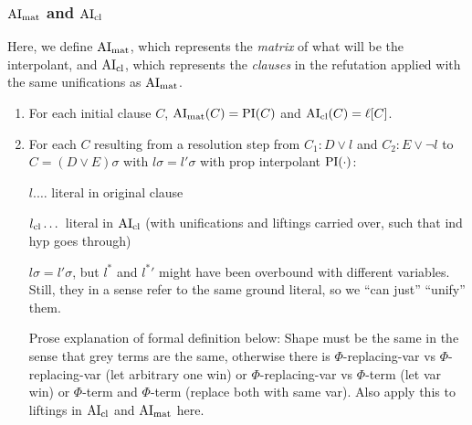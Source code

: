 \documentclass[,%
	paper=a4,%
	DIV15, 
	liststotoc,
	bibtotoc,
	draft=false,%
	numbers=noendperiod
]{scrartcl}
\begin{document}
\subsubsection{$\operatorname{AI}_\mathrm{mat}$ and $\operatorname{AI}_\mathrm{cl}$}

Here, we define $\operatorname{AI}_\mathrm{mat}$, which represents the \emph{matrix} of what will be the interpolant, and $\operatorname{AI}_\mathrm{cl}$, which represents the \emph{clauses} in the refutation applied with the same unifications as $\operatorname{AI}_\mathrm{mat}$.

\begin{enumerate}
	\item 
		For each initial clause $C$, $\operatorname{AI}_\mathrm{mat}(C) = \operatorname{PI}(C)$ and $\operatorname{AI}_\mathrm{cl}(C) = \ell[C]$.

	\item
		For each $C$ resulting from a resolution step from $C_1: D\lor l$ and $C_2: E\lor \lnot l$ to $C = (D \lor E)\sigma$ with $l\sigma = l'\sigma$ with prop interpolant $\operatorname{PI}(\cdot)$:

		$l.\dotsc$ literal in original clause

		$l_\mathrm{cl}\dotsc$ literal in $\operatorname{AI}_\mathrm{cl}$ (with unifications and liftings carried over, such that ind hyp goes through)


		$l\sigma = l'\sigma$, but $l^*$ and ${l^*}'$ might have been overbound with different variables. Still, they in a sense refer to the same ground literal, so we ``can just'' ``unify'' them.
		
		Prose explanation of formal definition below: Shape must be the same in the sense that grey terms are the same, otherwise there is $\Phi$-replacing-var vs $\Phi$-replacing-var (let arbitrary one win) or $\Phi$-replacing-var vs $\Phi$-term (let var win) or $\Phi$-term and $\Phi$-term (replace both with same var). 
		Also apply this to liftings in $\operatorname{AI}_\mathrm{cl}$ and $\operatorname{AI}_\mathrm{mat}$ here.


\end{enumerate}
\end{document}

